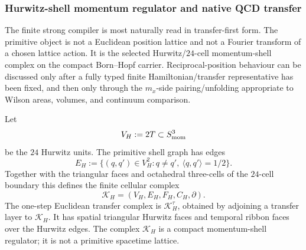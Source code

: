\documentclass[12pt,a4paper]{article}
\begin{document}
\subsubsection{Hurwitz-shell momentum regulator and native QCD transfer}
\label{p10:subsec:hurwitz-shell-momentum-regulator-native-qcd-transfer}

The finite strong compiler is most naturally read in transfer-first form.  The primitive object is not a Euclidean position lattice and not a Fourier transform of a chosen lattice action.  It is the selected Hurwitz/\(24\)-cell momentum-shell complex on the compact Born--Hopf carrier.  Reciprocal-position behaviour can be discussed only after a fully typed finite Hamiltonian/transfer representative has been fixed, and then only through the \(m_x\)-side pairing/unfolding appropriate to Wilson areas, volumes, and continuum comparison.

\begin{definition}
\label{p10:def:hurwitz-shell-transfer-complex}
Let
\begin{equation}
\label{p10:eq:hurwitz-shell-vertex-set}
V_H:=2T\subset S^3_{\rm mom}
\end{equation}
be the \(24\) Hurwitz units.  The primitive shell graph has edges
\begin{equation}
\label{p10:eq:hurwitz-shell-edge-set}
E_H:=\{(q,q')\in V_H^2:q\ne q',\ \langle q,q'\rangle=1/2\}.
\end{equation}
Together with the triangular faces and octahedral three-cells of the \(24\)-cell boundary this defines the finite cellular complex
\begin{equation}
\label{p10:eq:hurwitz-shell-cell-complex}
\mathcal K_H=(V_H,E_H,F_H,C_H,\partial).
\end{equation}
The one-step Euclidean transfer complex is \(\mathcal K_H^\tau\), obtained by adjoining a transfer layer to \(\mathcal K_H\).  It has spatial triangular Hurwitz faces and temporal ribbon faces over the Hurwitz edges.  The complex \(\mathcal K_H\) is a compact momentum-shell regulator; it is not a primitive spacetime lattice.
\end{definition}
\end{document}
